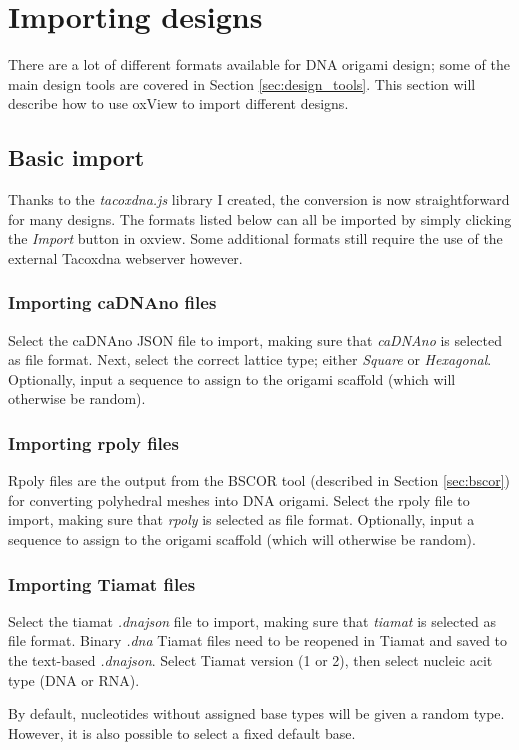 \section{Importing designs}\label{sec:cadnanoConv}
There are a lot of different formats available for DNA origami design; some of the main design tools are covered in Section \ref{sec:design_tools}. This section will describe how to use oxView to import different designs.

\subsection{Basic import}
Thanks to the \emph{tacoxdna.js} library I created, the conversion is now straightforward for many designs. The formats listed below can all be imported by simply clicking the \emph{Import} button in oxview. Some additional formats still require the use of the external Tacoxdna webserver\cite{taco} however.
\subsubsection{Importing caDNAno files}
Select the caDNAno JSON file to import, making sure that \emph{caDNAno} is selected as file format. Next, select the correct lattice type; either \emph{Square} or \emph{Hexagonal}. Optionally, input a sequence to assign to the origami scaffold (which will otherwise be random).

\subsubsection{Importing rpoly files}
Rpoly files are the output from the BSCOR\cite{vHelix} tool (described in Section \ref{sec:bscor}) for converting polyhedral meshes into DNA origami.
Select the rpoly file to import, making sure that \emph{rpoly} is selected as file format. Optionally, input a sequence to assign to the origami scaffold (which will otherwise be random).

\subsubsection{Importing Tiamat files}
Select the tiamat \emph{.dnajson} file to import, making sure that \emph{tiamat} is selected as file format. Binary \emph{.dna} Tiamat files need to be reopened in Tiamat and saved to the text-based \emph{.dnajson}. Select Tiamat version (1 or 2), then select nucleic acit type (DNA or RNA).

By default, nucleotides without assigned base types will be given a random type. However, it is also possible to select a fixed default base.

